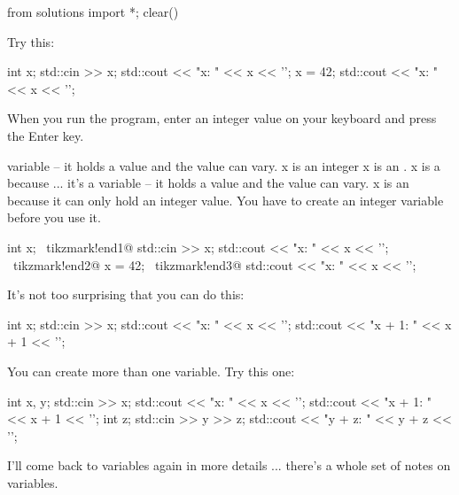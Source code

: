 \begin{python0}
from solutions import *; clear()
\end{python0}

Try this:
\begin{console}
int x;
std::cin >> x;
std::cout << "x: " << x << '\n';
x = 42;
std::cout << "x: " << x << '\n';
\end{console}

When you run the program, enter an integer value on your keyboard and
press the Enter key.

variable – it holds a value and the value can vary. x is an integer
x is an . x is a  because ... it's a
variable – it holds a value and the value can vary. x is an  because it can only hold an integer value. You have to create an
integer variable before you use it.


\begin{console}[commandchars=\~\!\@]
int x; ~tikzmark!end1@
std::cin >> x;
std::cout << "x: " << x << '\n'; ~tikzmark!end2@
x = 42; ~tikzmark!end3@
std::cout << "x: " << x << '\n';
\end{console}

%

It's not too surprising that you can do this:
\begin{console}
int x;
std::cin >> x;
std::cout << "x: " << x << '\n';
std::cout << "x + 1: " << x + 1 << '\n';
\end{console}

You can create more than one variable. Try this one:
\begin{console}
int x, y;
std::cin >> x;
std::cout << "x: " << x << '\n';
std::cout << "x + 1: " << x + 1 << '\n';
int z;
std::cin >> y >> z;
std::cout << "y + z: " << y + z << '\n';
\end{console}

I'll come back to variables again in more details ... there's a whole set of
notes on variables.

%
%

